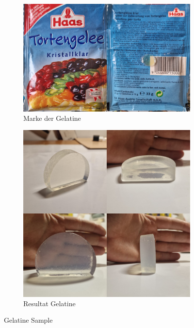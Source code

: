 \documentclass[colorlinks = true, allcolors = black, ngerman, 11pt,
a4paper, twoside, titlepage]{article}
\numberwithin{figure}{section}
\begin{document}
	\begin{figure}[h]
		\centering
		\begin{subfigure}{0.4\textwidth}
			\centering
			\includegraphics[height=0.7\textwidth]{imgs/gelatine_beutel}
			\caption{Marke der Gelatine}
			\label{fig:gelatinebeutel}
		\end{subfigure}
		\hfil
		\begin{subfigure}{0.4\textwidth}
			\centering
			\includegraphics[height=0.7\textwidth]{imgs/gelatine_ansichten}
			\caption{Resultat Gelatine}
			\label{fig:gelatineansichten}
		\end{subfigure}
		\caption{Gelatine Sample}
		\label{figs:gelatine-beutel-sample}
	\end{figure}
	
\end{document}
